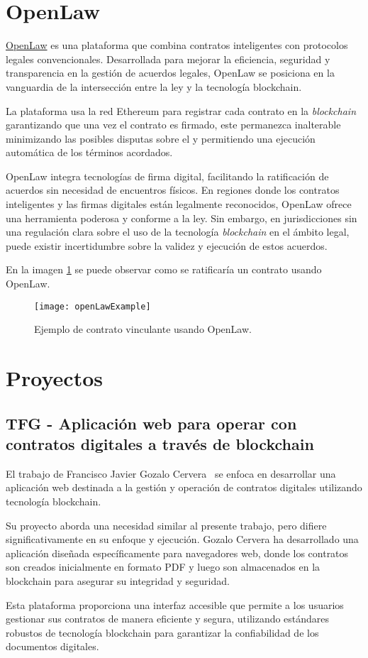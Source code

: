 
\section{OpenLaw}

\href{https://www.openlaw.io/}{OpenLaw} es una plataforma que combina contratos inteligentes con protocolos legales convencionales.
Desarrollada para mejorar la eficiencia, seguridad y transparencia en la gestión de acuerdos legales, OpenLaw se posiciona en la vanguardia de la intersección entre la ley y la tecnología blockchain.

La plataforma usa la red Ethereum para registrar cada contrato  en la \textit{blockchain} garantizando que una vez el contrato es firmado, este permanezca inalterable minimizando las posibles disputas sobre el y permitiendo una ejecución automática de los términos acordados.

OpenLaw integra tecnologías de firma digital, facilitando la ratificación de acuerdos sin necesidad de encuentros físicos.
En regiones donde los contratos inteligentes y las firmas digitales están legalmente reconocidos, OpenLaw ofrece una herramienta poderosa y conforme a la ley. Sin embargo, en jurisdicciones sin una regulación clara sobre el uso de la tecnología \textit{blockchain} en el ámbito legal, puede existir incertidumbre sobre la validez y ejecución de estos acuerdos.

En la imagen \ref{fig:openLawExample} se puede observar como se ratificaría un contrato usando OpenLaw.

\begin{figure}[h]
	\centering
	\texttt{[image: openLawExample]}
	\caption[Ejemplo OpenLaw]{Ejemplo de contrato vinculante usando OpenLaw.}
	\label{fig:openLawExample}
\end{figure}

\section{Proyectos}

\subsection{TFG - Aplicación web para operar con contratos digitales a través
de blockchain}

El trabajo de Francisco Javier Gozalo Cervera~\cite{tfgSmartContacts} se enfoca en desarrollar una aplicación web destinada a la gestión y operación de contratos digitales utilizando tecnología blockchain.

Su proyecto aborda una necesidad similar al presente trabajo, pero difiere significativamente en su enfoque y ejecución. Gozalo Cervera ha desarrollado una aplicación diseñada específicamente para navegadores web, donde los contratos son creados inicialmente en formato PDF y luego son almacenados en la blockchain para asegurar su integridad y seguridad.

Esta plataforma proporciona una interfaz accesible que permite a los usuarios gestionar sus contratos de manera eficiente y segura, utilizando estándares robustos de tecnología blockchain para garantizar la confiabilidad de los documentos digitales.